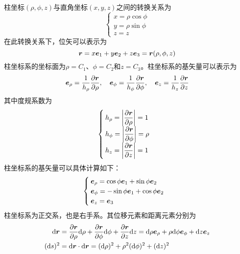 柱坐标$(\rho,\phi,z)$与直角坐标$(x,y,z)$之间的转换关系为
\begin{equation}
	\begin{cases}
		x = \rho \cos \phi \\
		y = \rho \sin \phi \\
		z = z
	\end{cases}
\end{equation}
在此转换关系下，位矢可以表示为
\begin{equation}
	\boldsymbol{r} = x\boldsymbol{e}_1 + y\boldsymbol{e}_2 + z\boldsymbol{e}_3 = \boldsymbol{r}(\rho,\phi,z)
\end{equation}
柱坐标系的坐标面为$\rho = C_1$、$\phi = C_2$和$z = C_3$。柱坐标系的基矢量可以表示为
\begin{equation}
	\boldsymbol{e}_\rho = \frac{1}{h_\rho} \frac{\partial \boldsymbol{r}}{\partial \rho},\quad \boldsymbol{e}_\phi = \frac{1}{h_\phi} \frac{\partial \boldsymbol{r}}{\partial \phi},\quad \boldsymbol{e}_z = \frac{1}{h_z} \frac{\partial \boldsymbol{r}}{\partial z}
\end{equation}
其中度规系数为
\begin{equation}
	\begin{cases}
		h_\rho = \left|\dfrac{\partial \boldsymbol{r}}{\partial \rho}\right| = 1 \\
		h_\phi = \left|\dfrac{\partial \boldsymbol{r}}{\partial \phi}\right| = \rho \\
		h_z = \left|\dfrac{\partial \boldsymbol{r}}{\partial z}\right| = 1
	\end{cases}
\end{equation}
柱坐标系的基矢量可以具体计算如下：
\begin{equation}
	\begin{cases}
		\boldsymbol{e}_\rho = \cos \phi \boldsymbol{e}_1 + \sin \phi \boldsymbol{e}_2 \\
		\boldsymbol{e}_\phi = -\sin \phi \boldsymbol{e}_1 + \cos \phi \boldsymbol{e}_2 \\
		\boldsymbol{e}_z = \boldsymbol{e}_3
	\end{cases}
\end{equation}
柱坐标系为正交系，也是右手系。其位移元素和距离元素分别为
\begin{align}
	\mathrm{d} \boldsymbol{r} & = \frac{\partial \boldsymbol{r}}{\partial \rho} \mathrm{d} \rho + \frac{\partial \boldsymbol{r}}{\partial \phi} \mathrm{d} \phi + \frac{\partial \boldsymbol{r}}{\partial z} \mathrm{d} z = \mathrm{d} \rho \boldsymbol{e}_\rho + \rho\mathrm{d} \phi \boldsymbol{e}_\phi + \mathrm{d} z \boldsymbol{e}_z \\
	(\mathrm{d} s)^2 & = \mathrm{d} \boldsymbol{r} \cdot \mathrm{d} \boldsymbol{r} = (\mathrm{d} \rho)^2 + \rho^2 (\mathrm{d} \phi)^2 + (\mathrm{d} z)^2
\end{align}

